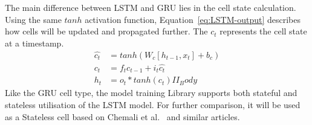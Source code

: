 The main difference between LSTM and GRU lies in the cell state calculation.
Using the same $tanh$ activation function, Equation~\ref{eq:LSTM-output} describes how cells will be updated and propagated further.
The $c_t$ represents the cell state at a timestamp.
\begin{equation}
    \begin{split}
        \hat{c_t} &= tanh \left(W_c \left[h_{t-1}, x_t \right] + b_c \right) \\
              c_t &= f_t c_{t-1}+i_t \hat{c_t} \\
              h_t &= o_t*tanh \left(c_t \right)II_Body
    \end{split}
    \label{eq:LSTM-output}
\end{equation}
Like the GRU cell type, the model training Library supports both stateful and stateless utilisation of the LSTM model.
For further comparison, it will be used as a Stateless cell based on Chemali et al.~\cite{Chemali2017} and similar articles.
%
%
